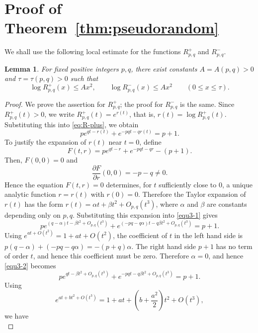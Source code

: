 \documentclass[twoside,12pt]{article}
\numberwithin{equation}{section}
\newtheorem{lemma}[theorem]{Lemma}
\begin{document}
\section{Proof of Theorem~\ref{thm:pseudorandom}}\label{sec:proof-pseudorandom}

We shall use the following local estimate for the functions
$R^+_{p,q}$ and $R^-_{p,q}$.

\begin{lemma}\label{lem:local-quadratic}
For fixed positive integers $p,q$, there exist constants
$A=A(p,q)>0$ and $\tau=\tau(p,q)>0$ such that
\[
        \log R^+_{p,q}(x)\le A x^2,
        \qquad
        \log R^-_{p,q}(x)\le A x^2
        \qquad(0\le x\le \tau).
\]
\end{lemma}

\begin{proof}
We prove the assertion for $R^+_{p,q}$; the proof for
$R^-_{p,q}$ is the same.  
Since $R^+_{p,q}(t)>0$, we write
$R^+_{p,q}(t)=e^{r(t)}$,
that is, $r(t)=\log R^+_{p,q}(t)$.
Substituting this into \eqref{eq:R-plus}, we obtain
\begin{equation}\label{equ3-1}
p e^{qt-r(t)}+e^{-pqt-qr(t)}=p+1.
\end{equation}
To justify the expansion of $r(t)$ near $t=0$, define
\[
        F(t,r)=p e^{qt-r}+e^{-pqt-qr}-(p+1).
\]
Then,
$F(0,0)=0$
and
\[
        \frac{\partial F}{\partial r}(0,0)
        =
        -p-q
        \ne0.
\]
Hence the equation $F(t,r)=0$ determines, for $t$ sufficiently close to $0$, a unique analytic function $r=r(t)$ with $r(0)=0$.  Therefore the Taylor expansion of $r(t)$ has the form
$r(t)=\alpha t+\beta t^2+O_{p,q}(t^3)$,
where $\alpha$ and $\beta$ are constants depending only on $p,q$.
Substituting this expansion into \eqref{equ3-1}
gives
\begin{equation}\label{equ3-2}
p e^{(q-\alpha)t-\beta t^2+O_{p,q}(t^3)}
        +
        e^{(-pq-q\alpha)t-q\beta t^2+O_{p,q}(t^3)}
        =
        p+1.
\end{equation}
Using $e^{at+O(t^2)}=1+at+O(t^2)$, the coefficient of $t$ in the left hand side is
        $p(q-\alpha)+(-pq-q\alpha)
        =
        -(p+q)\alpha$.
The right hand side $p+1$ has no term of order $t$, and hence this coefficient must be zero.  Therefore $\alpha=0$, and hence \eqref{equ3-2} becomes
\[
        p e^{qt-\beta t^2+O_{p,q}(t^3)}
        +
        e^{-pqt-q\beta t^2+O_{p,q}(t^3)}
        =
        p+1.
\]
Using
\[
        e^{at+bt^2+O(t^3)}
        =
        1+at+\left(b+\frac{a^2}{2}\right)t^2+O(t^3),
\]
we have
\begin{equation}\label{eq-p}

\end{equation}
\end{proof}
\end{document}
